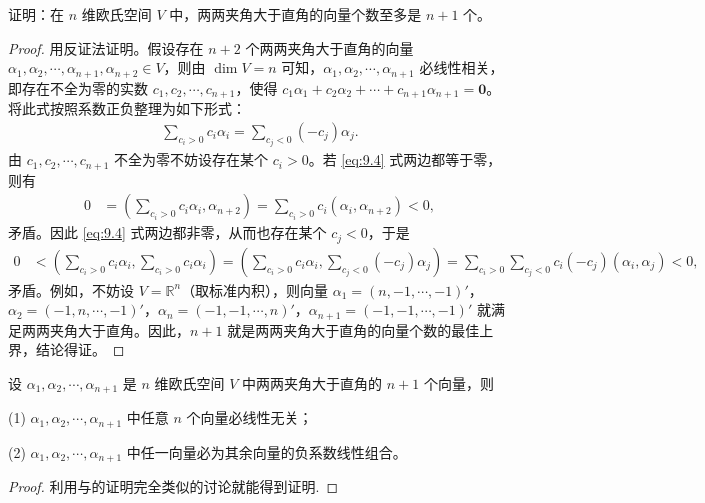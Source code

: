 \documentclass[../../main.tex]{subfiles}
\begin{document}
\begin{proposition}\label{proposition:例9.6}
证明：在 $n$ 维欧氏空间 $V$ 中，两两夹角大于直角的向量个数至多是 $n + 1$ 个。
\end{proposition}
\begin{proof}
用反证法证明。假设存在 $n + 2$ 个两两夹角大于直角的向量 $\alpha_1,\alpha_2,\cdots,\alpha_{n + 1},\alpha_{n + 2}\in V$，则由 $\dim V = n$ 可知，$\alpha_1,\alpha_2,\cdots,\alpha_{n + 1}$ 必线性相关，即存在不全为零的实数 $c_1,c_2,\cdots,c_{n + 1}$，使得 $c_1\alpha_1 + c_2\alpha_2 + \cdots + c_{n + 1}\alpha_{n + 1} = \mathbf{0}$。将此式按照系数正负整理为如下形式：
\begin{align}
\sum_{c_i > 0}c_i\alpha_i = \sum_{c_j < 0}(-c_j)\alpha_j.\label{eq:9.4}
\end{align}
由 $c_1,c_2,\cdots,c_{n + 1}$ 不全为零不妨设存在某个 $c_i > 0$。若 \eqref{eq:9.4} 式两边都等于零，则有
\begin{align*}
0&=(\sum_{c_i > 0}c_i\alpha_i,\alpha_{n + 2})=\sum_{c_i > 0}c_i(\alpha_i,\alpha_{n + 2})<0,
\end{align*}
矛盾。因此 \eqref{eq:9.4} 式两边都非零，从而也存在某个 $c_j < 0$，于是
\begin{align*}
0&<(\sum_{c_i > 0}c_i\alpha_i,\sum_{c_i > 0}c_i\alpha_i)=(\sum_{c_i > 0}c_i\alpha_i,\sum_{c_j < 0}(-c_j)\alpha_j)=\sum_{c_i > 0}\sum_{c_j < 0}c_i(-c_j)(\alpha_i,\alpha_j)<0,
\end{align*}
矛盾。例如，不妨设 $V = \mathbb{R}^n$（取标准内积），则向量 $\alpha_1 = (n,-1,\cdots,-1)'$，$\alpha_2 = (-1,n,\cdots,-1)'$，$\alpha_n = (-1,-1,\cdots,n)'$，$\alpha_{n + 1} = (-1,-1,\cdots,-1)'$ 就满足两两夹角大于直角。因此，$n + 1$ 就是两两夹角大于直角的向量个数的最佳上界，结论得证。 

\end{proof}

\begin{corollary}\label{corollary:例9.6}
设 $\alpha_1,\alpha_2,\cdots,\alpha_{n + 1}$ 是 $n$ 维欧氏空间 $V$ 中两两夹角大于直角的 $n + 1$ 个向量，则

(1) $\alpha_1,\alpha_2,\cdots,\alpha_{n + 1}$ 中任意 $n$ 个向量必线性无关；

(2) $\alpha_1,\alpha_2,\cdots,\alpha_{n + 1}$ 中任一向量必为其余向量的负系数线性组合。
\end{corollary}
\begin{proof}
利用与的证明完全类似的讨论就能得到证明.

\end{proof}
\end{document}
